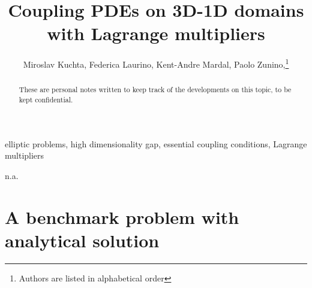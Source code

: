 \documentclass[r]{siamart171218}
\title{Coupling PDEs on 3D-1D domains with Lagrange multipliers}
\author{Miroslav Kuchta, Federica Laurino, Kent-Andre Mardal, Paolo Zunino,\thanks{Authors are listed in alphabetical order}}
\begin{document}
\maketitle

\begin{abstract}
These are personal notes written to keep track of the developments on this topic, to be kept confidential.
\end{abstract}

\begin{keywords}
elliptic problems, high dimensionality gap, essential coupling conditions, Lagrange multipliers
\end{keywords}

\begin{AMS}
n.a.
\end{AMS}

 

\def\ud{u_{\odot}}
\def\vd{v_{\odot}}
\def\uf{u_{\ominus}}
\def\up{u_{\oplus}}
\def\eps{\epsilon}
\def\nn{\boldsymbol n}
\def\rr{\boldsymbol r}
\def\RR{\boldsymbol R}
\def\kk{\boldsymbol k}
\def\ss{\boldsymbol s}
\def\uu{\boldsymbol u}
\def\vv{\boldsymbol v}
\def\xx{\boldsymbol x}
\def\bu{\overline{u}}
\def\bv{\overline{v}}
\def\tu{\widetilde{u}}
\def\tv{\widetilde{v}}
\def\TT{\boldsymbol T}
\def\NN{\boldsymbol N}
\def\BB{\boldsymbol B}
\def\ttu{\widetilde{\widetilde{u}}}
\def\ttv{\widetilde{\widetilde{v}}}
\def\cv{\check{v}}
\def\mesh{{\cal T}^h}
\def\ball{{\cal B}}
\def\R{\mathbb{R}}
\def\D{\mathcal{D}}
\def\DD{\partial\mathcal{D}}
\def\trace{\overline{\mathcal{R}}}
\def\ext{\mathcal{E}}
\def\ide{\mathcal{I}}
\def\ii{\hat{\imath}}
\newcommand{\avrd}[1]{\overline{\overline{#1}}}
\newcommand{\avrc}[1]{\overline{#1}}
\newcommand{\refe}[1]{{#1}_{\mathrm{ref}}}

\newcommand{\vertiii}[1]{{\left\vert\kern-0.25ex\left\vert\kern-0.25ex\left\vert #1 
    \right\vert\kern-0.25ex\right\vert\kern-0.25ex\right\vert}}

\newtheorem{thm}{Theorem}[section]
\newtheorem{prop}{Property}[section]
\theoremstyle{remark}
\newtheorem{remark}{Remark}[section]
 
\section{A benchmark problem with analytical solution}
\end{document}
